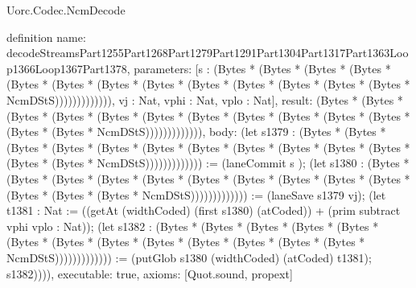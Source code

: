 \begin{lexlean}{Uorc.Codec.NcmDecode}
\begin{semanticmodule}
definition{
  name: decodeStreamsPart1255Part1268Part1279Part1291Part1304Part1317Part1363Loop1366Loop1367Part1378,
  parameters: [s : (Bytes * (Bytes * (Bytes * (Bytes * (Bytes * (Bytes * (Bytes * (Bytes * (Bytes * (Bytes * (Bytes * (Bytes * (Bytes * NcmDStS))))))))))))), vj : Nat, vphi : Nat, vplo : Nat],
  result: (Bytes * (Bytes * (Bytes * (Bytes * (Bytes * (Bytes * (Bytes * (Bytes * (Bytes * (Bytes * (Bytes * (Bytes * (Bytes * NcmDStS))))))))))))),
  body: (let s1379 : (Bytes * (Bytes * (Bytes * (Bytes * (Bytes * (Bytes * (Bytes * (Bytes * (Bytes * (Bytes * (Bytes * (Bytes * (Bytes * NcmDStS))))))))))))) := (laneCommit s ); (let s1380 : (Bytes * (Bytes * (Bytes * (Bytes * (Bytes * (Bytes * (Bytes * (Bytes * (Bytes * (Bytes * (Bytes * (Bytes * (Bytes * NcmDStS))))))))))))) := (laneSave s1379 vj); (let t1381 : Nat := ((getAt (widthCoded) (first s1380) (atCoded)) + (prim subtract vphi vplo : Nat)); (let s1382 : (Bytes * (Bytes * (Bytes * (Bytes * (Bytes * (Bytes * (Bytes * (Bytes * (Bytes * (Bytes * (Bytes * (Bytes * (Bytes * NcmDStS))))))))))))) := (putGlob s1380 (widthCoded) (atCoded) t1381); s1382)))),
  executable: true,
  axioms: [Quot.sound, propext]
}


\end{semanticmodule}
\end{lexlean}
